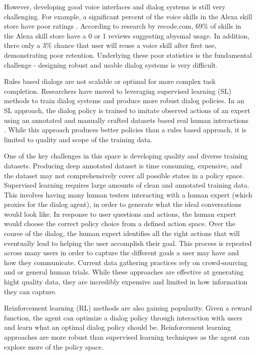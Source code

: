 However, developing good voice interfaces and dialog systems is still very challenging. For example, a significant percent of the voice skills in the Alexa skill store have poor ratings \cite{rey_2017}. According to research by recode.com, 69\% of skills in the Alexa skill store have a 0 or 1 reviews suggesting abysmal usage. In addition, there only a 3\% chance that user will reuse a voice skill after first use, demonstrating poor retention. Underlying these poor statistics is the fundamental challenge - designing robust and usable dialog systems is very difficult. 
 
Rules based dialogs are not scalable or optimal for more complex task completion. Researchers have moved to leveraging supervised learning (SL) methods to train dialog systems and produce more robust dialog policies. In an SL approach, the dialog policy is trained to imitate observed actions of an expert using an annotated and manually crafted datasets based real human interactions \cite{Schatzmann2006ASO}. While this approach produces better policies than a rules based approach, it is limited to quality and scope of the training data. 

One of the key challenges in this space is developing quality and diverse training datasets. Producing deep annotated dataset is time consuming, expensive, and the dataset may not comprehensively cover all possible states in a policy space. Supervised learning requires large amounts of clean and annotated training data. This involves having many human testers interacting with a human expert (which proxies for the dialog agent), in order to generate what the ideal conversations would look like. In response to user questions and actions, the human expert would choose the correct policy choice from a defined action space. Over the course of the dialog, the human expert identifies all the right actions that will eventually lead to helping the user accomplish their goal. This process is repeated across many users in order to capture the different goals a user may have and how they communicate. Current data gathering practices rely on crowd-sourcing and or general human trials. While these approaches are effective at generating hight quality data, they are incredibly expensive and limited in how information they can capture.  

Reinforcement learning (RL) methods are also gaining popularity. Given a reward function, the agent can optimize a dialog policy through interaction with users and learn what an optimal dialog policy should be. Reinforcement learning approaches are more robust than supervised learning techniques as the agent can explore more of the policy space.

